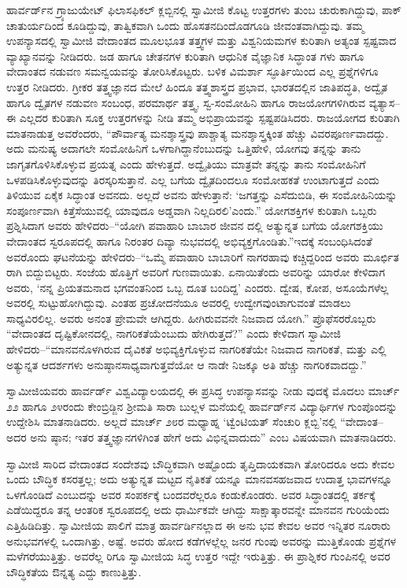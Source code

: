 ಹಾರ್ವರ್ಡ್​ನ ಗ್ರ್ಯಾಜುಯೇಟ್ ಫಿಲಾಸಫಿಕಲ್ ಕ್ಲಬ್ಬಿನಲ್ಲಿ ಸ್ವಾಮೀಜಿ ಕೊಟ್ಟ ಉತ್ತರಗಳು ತುಂಬ ಚುರುಕಾಗಿದ್ದುವು, ಪಾಕ್ ಚಾತುರ್ಯದಿಂದ ಕೂಡಿದ್ದುವು, ತಾತ್ವಿಕವಾಗಿ ಒಂದು ಹೊಸತನದಿಂದೊಡಗೂಡಿ ಜೀವಂತವಾಗಿದ್ದುವು. ತಮ್ಮ ಉಪನ್ಯಾಸದಲ್ಲಿ ಸ್ವಾಮೀಜಿ ವೇದಾಂತದ ಮೂಲಭೂತ ತತ್ತ್ವಗಳ ಮತ್ತು ವಿಶ್ವನಿಯಮಗಳ ಕುರಿತಾಗಿ ಅತ್ಯಂತ ಸ್ಪಷ್ಟವಾದ ವ್ಯಾಖ್ಯಾನವನ್ನು ನೀಡಿದರು. ಜಡ ಹಾಗೂ ಚೇತನಗಳ ಕುರಿತಾಗಿ ಆಧುನಿಕ ವೈಜ್ಞಾನಿಕ ಸಿದ್ಧಾಂತ ಗಳು ಹಾಗೂ ವೇದಾಂತದ ನಡುವಣ ಸಮನ್ವಯವನ್ನು ತೋರಿಸಿಕೊಟ್ಟರು. ಬಳಿಕ ವಿಮರ್ಶಾ ಸ್ಫೂರ್ತಿಯಿಂದ ಎಲ್ಲ ಪ್ರಶ್ನೆಗಳಿಗೂ ಉತ್ತರ ನೀಡಿದರು. ಗ್ರೀಕರ  ತತ್ತ್ವಜ್ಞಾನದ ಮೇಲೆ ಹಿಂದೂ ತತ್ತ್ವಶಾಸ್ತ್ರದ ಪ್ರಭಾವ, ಭಾರತದಲ್ಲಿನ ಜಾತಿಪದ್ಧತಿ, ಅದ್ವೈತ ಹಾಗೂ ದ್ವೈತಗಳ ನಡುವಣ ಸಂಬಂಧ, ಪರಮಾರ್ಥ ತತ್ತ್ವ, ಸ್ವ-ಸಂಮೋಹಿನಿ  ಹಾಗೂ ರಾಜಯೋಗಗಳಿಗಿರುವ ವ್ಯತ್ಯಾಸ–ಈ ಎಲ್ಲದರ ಕುರಿತಾಗಿ ಸೂಕ್ತ ಉತ್ತರಗಳನ್ನು ನೀಡಿ ತಮ್ಮ ಅಭಿಪ್ರಾಯವನ್ನು ಸ್ಪಷ್ಟಪಡಿಸಿದರು. ರಾಜಯೋಗದ ಕುರಿತಾಗಿ ಮಾತನಾಡುತ್ತ ಅವರೆಂದರು, “ಪೌರ್ವಾತ್ಯ ಮನಶ್ಶಾಸ್ತ್ರವು ಪಾಶ್ಚಾತ್ಯ ಮನಶ್ಶಾಸ್ತ್ರಕ್ಕಿಂತ ಹೆಚ್ಚು ವಿವರಪೂರ್ಣವಾದದ್ದು. ಅದು ಮನುಷ್ಯ ಅದಾಗಲೇ ಸಂಮೋಹಿನಿಗೆ ಒಳಗಾಗಿದ್ದಾನೆಂಬುದನ್ನು ಒತ್ತಿಹೇಳಿ, ಯೋಗವು ತನ್ನನ್ನು ತಾನು ಜಾಗೃತಗೊಳಿಸಿಕೊಳ್ಳುವ  ಪ್ರಯತ್ನ ಎಂದು ಹೇಳುತ್ತದೆ. ಅದ್ವೈತಿಯು ಮಾತ್ರವೇ ತನ್ನನ್ನು ತಾನು ಸಂಮೋಹಿನಿಗೆ ಒಳಪಡಿಸಿಕೊಳ್ಳುವುದನ್ನು ತಿರಸ್ಕರಿಸುತ್ತಾನೆ. ಎಲ್ಲ ಬಗೆಯ ದ್ವೈತದಿಂದಲೂ ಸಂಮೋಹಕತೆ ಉಂಟಾಗುತ್ತದೆ ಎಂದು ತಿಳಿಯುವ ಏಕೈಕ ಸಿದ್ಧಾಂತ ಅವನದು. ಅಲ್ಲದೆ ಅವನು ಹೇಳುತ್ತಾನೆ: ‘ಜಗತ್ತನ್ನು ಎಸೆದುಬಿಡಿ, ಈ ಸಂಮೋಹಿನಿಯನ್ನು ಸಂಪೂರ್ಣವಾಗಿ ಕಿತ್ತೆಸೆಯುವಲ್ಲಿ ಯಾವುದೂ ಅಡ್ಡವಾಗಿ ನಿಲ್ಲದಿರಲಿ’ಎಂದು.” ಯೋಗಶಕ್ತಿಗಳ ಕುರಿತಾಗಿ ಒಬ್ಬರು ಪ್ರಶ್ನಿಸಿದಾಗ ಅವರು ಹೇಳಿದರು–“ಯೋಗಿ ಪವಾಹಾರಿ ಬಾಬಾರ ಜೀವನ ದಲ್ಲಿ ಅತ್ಯುನ್ನತ ಬಗೆಯ ಯೋಗಶಕ್ತಿಯು ವೇದಾಂತದ ಸ್ವರೂಪದಲ್ಲಿ ಹಾಗೂ ನಿರಂತರ ದಿವ್ಯಾ ನುಭವದಲ್ಲಿ ಅಭಿವ್ಯಕ್ತಗೊಂಡಿತು.”ಇದಕ್ಕೆ ಸಂಬಂಧಿಸಿದಂತೆ ಅವರೊಂದು ಘಟನೆಯನ್ನು ಹೇಳಿದರು–“ಒಮ್ಮೆ ಪವಾಹಾರಿ ಬಾಬಾರಿಗೆ ನಾಗರಹಾವು ಕಚ್ಚಿದ್ದರಿಂದ ಅವರು ಮೂರ್ಛಿತ ರಾಗಿ ಬಿದ್ದುಬಿಟ್ಟರು. ಸಂಜೆಯ ಹೊತ್ತಿಗೆ ಅವರಿಗೆ ಗುಣವಾಯಿತು. ಏನಾಯಿತೆಂದು ಅವರಿನ್ನು ಯಾರೋ ಕೇಳಿದಾಗ ಅವರು, ‘ನನ್ನ ಪ್ರಿಯತಮನಾದ ಭಗವಂತನಿಂದ ಒಬ್ಬ ದೂತ ಬಂದಿದ್ದ’ ಎಂದರು. ದ್ವೇಷ, ಕೋಪ, ಅಸೂಯೆಗಳೆಲ್ಲ ಅವರಲ್ಲಿ ಸುಟ್ಟುಹೋಗಿದ್ದುವು. ಎಂತಹ ಪ್ರಚೋದನೆಯೂ ಅವರಲ್ಲಿ ಉದ್ವೇಗವುಂಟಾಗುವಂತೆ ಮಾಡಲು ಸಾಧ್ಯವಿರಲಿಲ್ಲ. ಅವರು ಅನಂತ ಪ್ರೇಮವೇ ಆಗಿದ್ದರು. ಹೀಗಿರುವವನೇ ನಿಜವಾದ ಯೋಗಿ.” ಪ್ರೊಫೆಸರರೊಬ್ಬರು “ವೇದಾಂತದ ದೃಷ್ಟಿಕೋನದಲ್ಲಿ, ನಾಗರಿಕತೆಯೆಂಬುದು ಹೇಗಿರುತ್ತದೆ?” ಎಂದು ಕೇಳಿದಾಗ ಸ್ವಾಮೀಜಿ ಹೇಳಿದರು–“ಮಾನವನೊಳಗಿರುವ ದೈವಿಕತೆ ಅಭಿವ್ಯಕ್ತಿಗೊಳ್ಳುವ ನಾಗರಿಕತೆಯೇ ನಿಜವಾದ ನಾಗರಿಕತೆ, ಮತ್ತು ಎಲ್ಲಿ ಅತ್ಯುನ್ನತ ಆದರ್ಶಗಳು ಅನುಷ್ಠಾನಸಾಧ್ಯವಾಗುತ್ತವೆಯೋ ಆ ನಾಡೇ ನಿಜಕ್ಕೂ ಅತಿ ಹೆಚ್ಚು ನಾಗರಿಕವಾದದ್ದು.”

ಸ್ವಾಮೀಜಿಯವರು ಹಾರ್ವರ್ಡ್ ವಿಶ್ವವಿದ್ಯಾಲಯದಲ್ಲಿ ಈ ಪ್ರಸಿದ್ಧ ಉಪನ್ಯಾಸವನ್ನು ನೀಡು ವುದಕ್ಕೆ ಮೊದಲು ಮಾರ್ಚ್ ೨೨ ಹಾಗೂ ೨೪ರಂದು ಕೇಂಬ್ರಿಡ್ಜಿನ ಶ್ರೀಮತಿ ಸಾರಾ ಬುಲ್ಲಳ ಮನೆಯಲ್ಲಿ ಹಾರ್ವರ್ಡ್​ನ ವಿದ್ಯಾರ್ಥಿಗಳ ಗುಂಪೊಂದನ್ನು ಉದ್ದೇಶಿಸಿ ಮಾತನಾಡಿದರು. ಅಲ್ಲದೆ ಮಾರ್ಚ್ ೨೮ರ ಮಧ್ಯಾಹ್ನ ‘ಟ್ವೆಂಟಿಯತ್ ಸೆಂಚುರಿ ಕ್ಲಬ್ಬಿ’ನಲ್ಲಿ “ವೇದಾಂತ–ಅದರ ಅನು ಷ್ಠಾನ; ಇತರ ತತ್ತ್ವಜ್ಞಾನಗಳಿಗಿಂತ ಹೇಗೆ ಅದು ವಿಭಿನ್ನವಾದುದು” ಎಂಬ ವಿಷಯವಾಗಿ ಮಾತನಾಡಿದರು.

ಸ್ವಾಮೀಜಿ ಸಾರಿದ ವೇದಾಂತದ ಸಂದೇಶವು ಬೌದ್ಧಿಕವಾಗಿ ಅಷ್ಟೊಂದು ತೃಪ್ತಿದಾಯಕವಾಗಿ ತೋರಿದರೂ ಅದು ಕೇವಲ ಒಂದು ಬೌದ್ಧಿಕ ಕಸರತ್ತಲ್ಲ; ಅದು ಅತ್ಯುನ್ನತ ಮಟ್ಟದ ನೈತಿಕತೆ ಯನ್ನೂ ಮಾನವಸಹಜವಾದ ಉದಾತ್ತ ಭಾವಗಳನ್ನೂ ಒಳಗೊಂಡಿದೆ ಎಂಬುದನ್ನು ಅವರ ಸಂಪರ್ಕಕ್ಕೆ ಬಂದವರೆಲ್ಲರೂ ಕಂಡುಕೊಂಡರು. ಅವರ ಸಿದ್ಧಾಂತದಲ್ಲಿ ತರ್ಕಕ್ಕೆ ಎಡೆಯಿದ್ದರೂ ತನ್ನ ಆಂತರಿಕ ಸ್ವರೂಪದಲ್ಲಿ ಅದು ಧಾರ್ಮಿಕವೇ ಆಗಿದ್ದು ಸಾಕ್ಷಾತ್ಕಾರವನ್ನೇ ಮಾನವನ ಗುರಿಯೆಂದು ಎತ್ತಿಹಿಡಿದಿತ್ತು. ಸ್ವಾಮೀಜಿಯ ಪಾಲಿಗೆ ಮಾತ್ರ ಹಾರ್ವರ್ಡಿನಲ್ಲಾದ ಈ ಅನು ಭವ ಕೇವಲ ಅವರ ಇನ್ನಿತರ ನೂರಾರು ಅನುಭವಗಳಲ್ಲಿ ಒಂದಾಗಿತ್ತು, ಅಷ್ಟೆ. ಅವರು ಹೋದ ಕಡೆಗಳಲ್ಲೆಲ್ಲ ಜನರ ಗುಂಪು ಅವರನ್ನು ಮುತ್ತಿಕೊಂಡು ಪ್ರಶ್ನೆಗಳ ಮಳೆಗರೆಯುತ್ತಿತ್ತು. ಅವರೆಲ್ಲ ರಿಗೂ ಸ್ವಾಮೀಜಿಯ ಸಿದ್ಧ ಉತ್ತರ ಇದ್ದೇ ಇರುತ್ತಿತ್ತು. ಈ ಪ್ರಾಶ್ನಿಕರ ಗುಂಪಿನಲ್ಲಿ ಅವರ ಬೌದ್ಧಿಕತೆಯ ಔನ್ನತ್ಯ ಎದ್ದು ಕಾಣುತ್ತಿತ್ತು.


